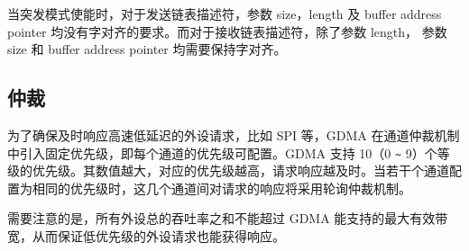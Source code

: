 \documentclass[main\_\_CN.tex]{subfiles}
\begin{document}
当突发模式使能时，对于发送链表描述符，参数 size，length 及 buffer address pointer 均没有字对齐的要求。而对于接收链表描述符，除了参数 length， 参数 size 和 buffer address pointer 均需要保持字对齐。


\subsection{仲裁}

为了确保及时响应高速低延迟的外设请求，比如 SPI 等，GDMA 在通道仲裁机制中引入固定优先级，即每个通道的优先级可配置。GDMA 支持 10（0 \verb+~+ 9）个等级的优先级。其数值越大，对应的优先级越高，请求响应越及时。当若干个通道配置为相同的优先级时，这几个通道间对请求的响应将采用轮询仲裁机制。

需要注意的是，所有外设总的吞吐率之和不能超过 GDMA 能支持的最大有效带宽，从而保证低优先级的外设请求也能获得响应。
\end{document}
